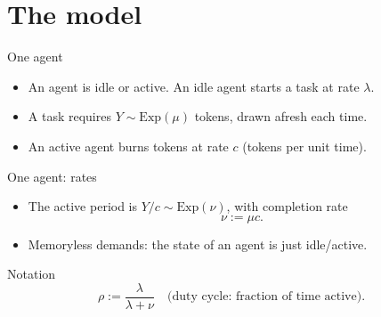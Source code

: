 \documentclass[aspectratio=169]{beamer}
\newenvironment*{myitem}[1][1.5em]{\begin{itemize}\setlength{\itemsep}{#1}}{\end{itemize}}
\begin{document}
\section{The model}

\begin{frame}{One agent}

	\begin{myitem}[1em]
		\item An agent is \alert{idle} or \alert{active}. An idle agent starts a task at rate $\lambda$.
		\item A task requires $Y\sim\text{Exp}(\mu)$ \alert{tokens}, drawn afresh each time.
		\item An active agent \alert{burns} tokens at rate $c$ (tokens per unit time).
	\end{myitem}

	\medskip

	\begin{center}
	\end{center}

	\vfill
\end{frame}

\begin{frame}{One agent: rates}

	\begin{myitem}
		\item The active period is $Y/c\sim\text{Exp}(\nu)$, with \alert{completion rate}
		\begin{equation*}
			\nu := \mu c .
		\end{equation*}
		\item Memoryless demands: the state of an agent is just \alert{idle/active}.
	\end{myitem}

	\medskip
	\pause

	\begin{block}{Notation}
		\begin{equation*}
			\rho := \frac{\lambda}{\lambda+\nu} \quad\text{(duty cycle: fraction of time active)}.
		\end{equation*}
	\end{block}
\end{frame}
\end{document}

